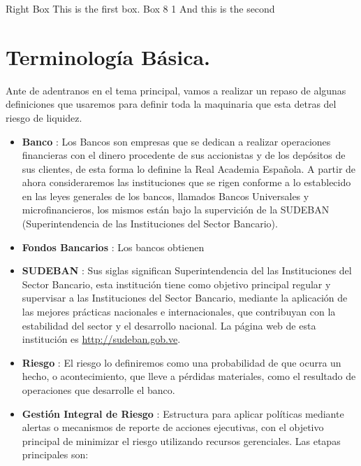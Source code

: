 \documentclass[]{article}
\begin{document}
Right Box This is the first box. Box 8 1 And this is the second

\hypertarget{terminologia-basica.}{%
\section{Terminología Básica.}\label{terminologia-basica.}}

Ante de adentranos en el tema principal, vamos a realizar un repaso de
algunas definiciones que usaremos para definir toda la maquinaria que
esta detras del riesgo de liquidez.

\begin{itemize}
\item
  \textbf{Banco} : Los Bancos son empresas que se dedican a realizar
  operaciones financieras con el dinero procedente de sus accionistas y
  de los depósitos de sus clientes, de esta forma lo definine la Real
  Academia Española. A partir de ahora consideraremos las instituciones
  que se rigen conforme a lo establecido en las leyes generales de los
  bancos, llamados Bancos Universales y microfinancieros, los mismos
  están bajo la supervición de la SUDEBAN (Superintendencia de las
  Instituciones del Sector Bancario).
\item
  \textbf{Fondos Bancarios} : Los bancos obtienen
\item
  \textbf{SUDEBAN} : Sus siglas significan Superintendencia del las
  Instituciones del Sector Bancario, esta institución tiene como
  objetivo principal regular y supervisar a las Instituciones del Sector
  Bancario, mediante la aplicación de las mejores prácticas nacionales e
  internacionales, que contribuyan con la estabilidad del sector y el
  desarrollo nacional. La página web de esta institución es
  \url{http://sudeban.gob.ve}.
\item
  \textbf{Riesgo} : El riesgo lo definiremos como una probabilidad de
  que ocurra un hecho, o acontecimiento, que lleve a pérdidas
  materiales, como el resultado de operaciones que desarrolle el banco.
\item
  \textbf{Gestión Integral de Riesgo} : Estructura para aplicar
  políticas mediante alertas o mecanismos de reporte de acciones
  ejecutivas, con el objetivo principal de minimizar el riesgo
  utilizando recursos gerenciales. Las etapas principales son:


\end{itemize}
\end{document}

